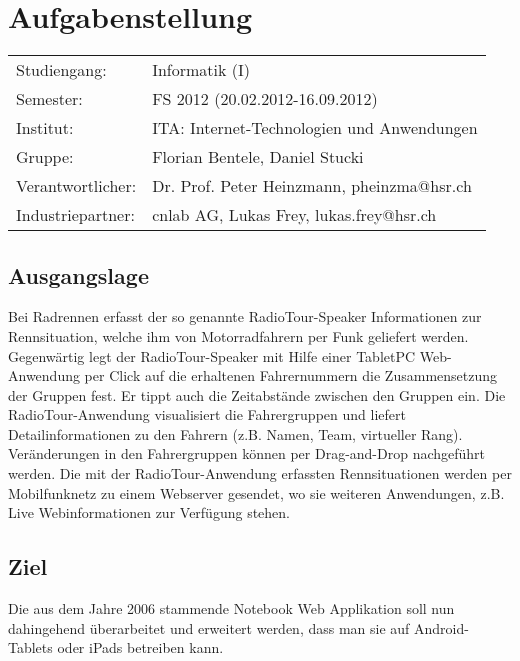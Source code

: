 \chapter*{Aufgabenstellung}

\begin{tabular}{ll}
Studiengang: & Informatik (I)\\
Semester: & FS 2012 (20.02.2012-16.09.2012)\\
Institut: & ITA: Internet-Technologien und Anwendungen\\
Gruppe: & Florian Bentele, Daniel Stucki\\
Verantwortlicher: & Dr. Prof. Peter Heinzmann, pheinzma@hsr.ch\\
Industriepartner: & cnlab AG, Lukas Frey, lukas.frey@hsr.ch

\end{tabular}

\section*{Ausgangslage}
Bei Radrennen erfasst der so genannte RadioTour-Speaker Informationen zur Rennsituation, welche ihm von Motorradfahrern per Funk geliefert werden. Gegenwärtig legt der RadioTour-Speaker mit Hilfe einer TabletPC Web-Anwendung per Click auf die erhaltenen Fahrernummern die Zusammensetzung der Gruppen fest. Er tippt auch die Zeitabstände zwischen den Gruppen ein. Die RadioTour-Anwendung  visualisiert die Fahrergruppen und liefert Detailinformationen zu den Fahrern (z.B. Namen, Team, virtueller Rang). Veränderungen in den Fahrergruppen können per Drag-and-Drop nachgeführt werden. Die mit der RadioTour-Anwendung erfassten Rennsituationen werden per Mobilfunknetz zu einem Webserver gesendet, wo sie weiteren Anwendungen, z.B. Live Webinformationen zur Verfügung stehen.

\section*{Ziel}
Die aus dem Jahre 2006 stammende Notebook Web Applikation soll nun dahingehend überarbeitet und erweitert werden, dass man sie auf Android-Tablets oder iPads betreiben kann.

